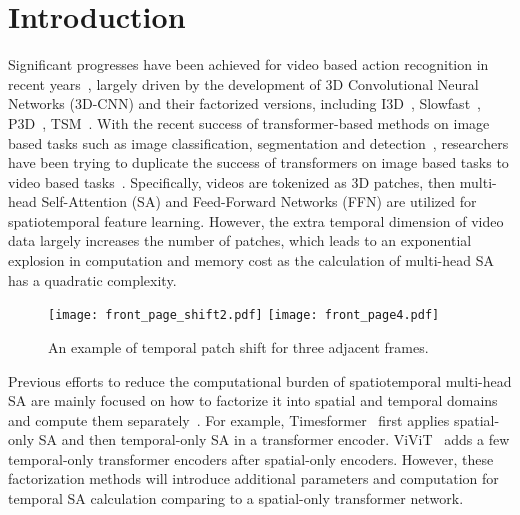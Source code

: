 \documentclass[runningheads]{llncs}
\begin{document}
	
	\section{Introduction}
	
	Significant progresses have been achieved for video based action recognition in recent years~\cite{carreira2017quo,qiu2017learning,feichtenhofer2019slowfast,wang2016temporal,lin2019tsm}, largely driven by the development of 3D Convolutional Neural Networks (3D-CNN) and their factorized versions, including I3D~\cite{carreira2017quo}, Slowfast~\cite{feichtenhofer2019slowfast}, P3D~\cite{qiu2017learning}, TSM~\cite{lin2019tsm}. With the recent success of transformer-based methods on image based tasks such as image classification, segmentation and detection~\cite{dosovitskiy2021an,liu2021swin,yuan2021tokens,han2021transformer,touvron2021training,chen2021crossvit}, researchers have been trying to duplicate the success of transformers on image based tasks to video based tasks~\cite{GedasBertasius2021IsSA,AnuragArnab2021ViViTAV,ZeLiu2021VideoST}. Specifically, videos are tokenized as 3D patches, then multi-head Self-Attention (SA) and Feed-Forward Networks (FFN) are utilized for spatiotemporal feature learning. However, the extra temporal dimension of video data largely increases the number of patches, which leads to an exponential explosion in computation and memory cost as the calculation of multi-head SA has a quadratic complexity. 
	
	
	\begin{figure}[t]
		
		\begin{center}
			\texttt{[image: front\_page\_shift2.pdf]}		
			\texttt{[image: front\_page4.pdf]}
			\caption{An example of temporal patch shift for three adjacent frames.}
			\label{fig:frontpage}
		\end{center}
	\end{figure}
	
	Previous efforts to reduce the computational burden of spatiotemporal multi-head SA are mainly focused on how to factorize it into spatial and temporal domains and compute them separately~\cite{GedasBertasius2021IsSA,AnuragArnab2021ViViTAV}. For example, Timesformer~\cite{GedasBertasius2021IsSA} first applies spatial-only SA and then temporal-only SA in a transformer encoder. ViViT~\cite{AnuragArnab2021ViViTAV} adds a few temporal-only transformer encoders after spatial-only encoders. However, these factorization methods will introduce additional parameters and computation for temporal SA calculation comparing to a spatial-only transformer network. 
	
\end{document}
